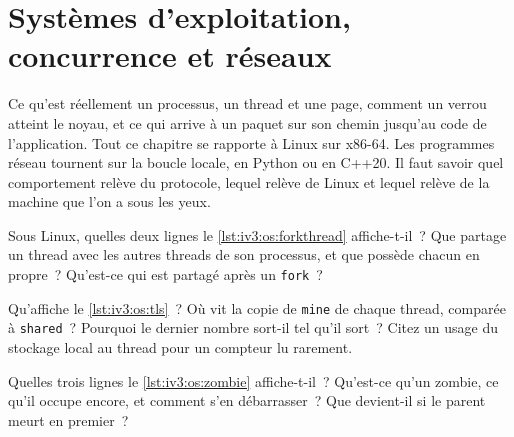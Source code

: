 \chapter{Systèmes d'exploitation, concurrence et réseaux}\label{ch:iv3:operating-systems-concurrency-and-networks}

\begin{ivtrains}
Ce qu'est réellement un processus, un thread et une page, comment un verrou atteint le noyau, et ce qui arrive à un paquet sur son chemin jusqu'au code de l'application. Tout ce chapitre se rapporte à Linux sur x86-64. Les programmes réseau tournent sur la boucle locale, en Python ou en C++20. Il faut savoir quel comportement relève du protocole, lequel relève de Linux et lequel relève de la machine que l'on a sous les yeux.
\end{ivtrains}

\begin{question}\label{iq:iv3:operating-systems-concurrency-and-networks:1}
Sous Linux, quelles deux lignes le \cref{lst:iv3:os:forkthread} affiche-t-il~? Que partage un thread avec les autres threads de son processus, et que possède chacun en propre~? Qu'est-ce qui est partagé après un \texttt{fork}~?
\label{lst:iv3:os:forkthread}
\end{question}

\begin{question}\label{iq:iv3:operating-systems-concurrency-and-networks:2}
Qu'affiche le \cref{lst:iv3:os:tls}~? Où vit la copie de \texttt{mine} de chaque thread, comparée à \texttt{shared}~? Pourquoi le dernier nombre sort-il tel qu'il sort~? Citez un usage du stockage local au thread pour un compteur lu rarement.
\label{lst:iv3:os:tls}
\end{question}

\begin{question}\label{iq:iv3:operating-systems-concurrency-and-networks:3}
Quelles trois lignes le \cref{lst:iv3:os:zombie} affiche-t-il~? Qu'est-ce qu'un zombie, ce qu'il occupe encore, et comment s'en débarrasser~? Que devient-il si le parent meurt en premier~?
\label{lst:iv3:os:zombie}
\end{question}


